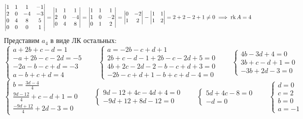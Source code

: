 $$
\begin{vmatrix}
	1 & 1 & 1 & -1 \\
    2 & 0 & -4 & -3 \\
    0 & 4 & 8 & 5 \\
    0 & 0 & 0 & 1
\end{vmatrix} =
\begin{vmatrix}
	1 & 1 & 1 \\
    2 & 0 & -4 \\
    0 & 4 & 8
\end{vmatrix} =
\begin{vmatrix}
	1 & 1 & 1 \\
    1 & 0 & -2 \\
    0 & 1 & 2
\end{vmatrix} =
\begin{vmatrix}
	0 & -2 \\
    1 & 2
\end{vmatrix} -
\begin{vmatrix}
	1 & 1 \\
    1 & 2
\end{vmatrix} = 2 + 2 - 2 + 1 \ne 0 \implies \operatorname{rk} A = 4 $$
Представим $ a_4 $ в виде ЛК остальных:
$$
\begin{cases}
	a + 2b + c - d = 1 \\
    -a + 2b - c - 2d = -5 \\
    -2a - b - c + d = -3 \\
    a - b + c + d = 4
\end{cases} \qquad
\begin{cases}
	a = -2b - c + d + 1 \\
    2b + c - d - 1 + 2b - c - 2d + 5 = 0 \\
    4b + 2c - 2d - 2 - b - c + d + 3 = 0 \\
    -2b - c + d + 1 - b + c + d - 4 = 0
\end{cases} \qquad
\begin{cases}
	4b - 3d + 4 = 0 \\
    3b + c - d + 1 = 0 \\
    -3b + 2d - 3 = 0
\end{cases} $$
$$
\begin{cases}
    b = \frac{3d - 4}4 \\
    \frac{9d - 12}4 + c - d + 1 = 0 \\
    \frac{-9d + 12}4 + 2d - 3 = 0
\end{cases} \qquad
\begin{cases}
	9d - 12 + 4c - 4d + 4 = 0 \\
    -9d + 12 + 8d - 12 = 0
\end{cases} \qquad
\begin{cases}
	5d + 4c - 8 = 0 \\
    -d = 0
\end{cases} \qquad
\begin{cases}
	d = 0 \\
    c = 2 \\
    b = 0 \\
    a = -1
\end{cases} $$

